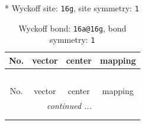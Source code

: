\documentclass[fleqn,8pt]{jsarticle}
\begin{document}
* Wyckoff site: {\tt 16g}, site symmetry: {\tt 1}
\renewcommand{\arraystretch}{1.2}
\begin{longtable}{cccc}
\caption{Wyckoff bond: {\tt 16a@16g}, bond symmetry: {\tt 1}}
 \\
 \hline \hline
No. & vector & center & mapping \\ \hline \endfirsthead

\multicolumn{3}{l}{\tablename\ \thetable{}} \\
 \hline \hline
No. & vector & center & mapping \\ \hline \endhead

 \hline \hline
\multicolumn{3}{r}{\footnotesize\it continued ...} \\ \endfoot

 \hline \hline
\multicolumn{3}{r}{} \\ \endlastfoot


\end{longtable}
\end{document}
